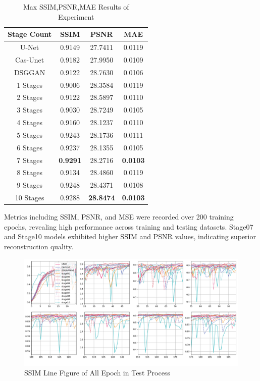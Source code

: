 \documentclass[a4paper, times, 10pt,twocolumn]{article}
\begin{document}
\begin{table}[h]
	\centering
	\caption{Max SSIM,PSNR,MAE Results of Experiment}
	\label{tab:exps_result}
	\begin{tabular}{cccc}
		\toprule
		Stage Count & SSIM            & PSNR             & MAE             \\
		\midrule
		U-Net       & 0.9149          & 27.7411          & 0.0119          \\
		Cas-Unet    & 0.9182          & 27.9950          & 0.0109          \\
		DSGGAN      & 0.9122          & 28.7630          & 0.0106          \\
		1 Stages    & 0.9006          & 28.3584          & 0.0119          \\
		2 Stages    & 0.9122          & 28.5897          & 0.0110          \\
		3 Stages    & 0.9030          & 28.7249          & 0.0105          \\
		4 Stages    & 0.9160          & 28.1237          & 0.0110          \\
		5 Stages    & 0.9243          & 28.1736          & 0.0111          \\
		6 Stages    & 0.9237          & 28.1355          & 0.0105          \\
		7 Stages    & \textbf{0.9291} & 28.2716          & \textbf{0.0103} \\
		8 Stages    & 0.9134          & 28.4860          & 0.0119          \\
		9 Stages    & 0.9248          & 28.4371          & 0.0108          \\
		10 Stages   & 0.9288          & \textbf{28.8474} & \textbf{0.0103} \\
		\bottomrule
	\end{tabular}
\end{table}

Metrics including SSIM, PSNR, and MSE were recorded over 200 training epochs, revealing high performance across training and testing datasets. Stage07 and Stage10 models exhibited higher SSIM and PSNR values, indicating superior reconstruction quality.

\begin{figure}[h]
	\centering
	\includegraphics[width=1.0\linewidth]{u-net/lung/csvimg_lung_mnv3/ssim_comparison_8.png}
	\caption[ssim]{SSIM Line Figure of All Epoch in Test Process}
	\label{fig:ssim}
\end{figure}
\end{document}

